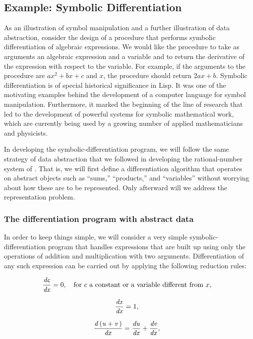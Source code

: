 \subsection{Example: Symbolic Differentiation}
\label{Section 2.3.2}

As an illustration of symbol manipulation and a further illustration of data
abstraction, consider the design of a procedure that performs symbolic
differentiation of algebraic expressions.  We would like the procedure to take
as arguments an algebraic expression and a variable and to return the
derivative of the expression with respect to the variable.  For example, if the
arguments to the procedure are \( ax^2 + bx + c \) and \( x \), the
procedure should return \( 2ax + b \).  Symbolic differentiation is of
special historical significance in Lisp.  It was one of the motivating examples
behind the development of a computer language for symbol manipulation.
Furthermore, it marked the beginning of the line of research that led to the
development of powerful systems for symbolic mathematical work, which are
currently being used by a growing number of applied mathematicians and
physicists.

In developing the symbolic-differentiation program, we will follow the same
strategy of data abstraction that we followed in developing the rational-number
system of .  That is, we will first define a differentiation
algorithm that operates on abstract objects such as ``sums,'' ``products,'' and
``variables'' without worrying about how these are to be represented.  Only
afterward will we address the representation problem.

\subsubsection*{The differentiation program with abstract data}

In order to keep things simple, we will consider a very simple
symbolic-differentiation program that handles expressions that are built up
using only the operations of addition and multiplication with two arguments.
Differentiation of any such expression can be carried out by applying the
following reduction rules:

$$
\frac{{\it dc}}{{\it dx}} = 0,
\quad {\rm for\ } c\ {\rm a\ constant\ or\ a\ variable\ different\ from\ } x,
$$


$$
\frac{{\it dx}}{{\it dx}} = 1,
$$


$$
\frac{{\it d\,(u + v\,)}}{{\it dx}}
=
\frac{{\it du}}{{\it dx}} + \frac{{\it dv}}{{\it dx}},
$$


